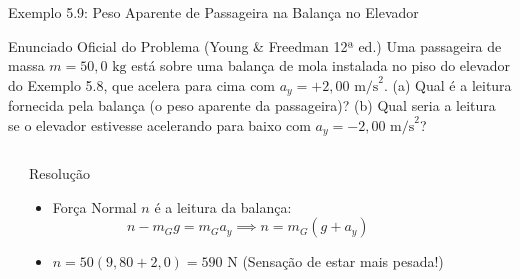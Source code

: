 \documentclass[10pt,aspectratio=169]{beamer}
\begin{document}
\begin{frame}{Exemplo 5.9: Peso Aparente de Passageira na Balança no Elevador}
    \begin{block}{Enunciado Oficial do Problema (Young \& Freedman 12ª ed.)}
        \small
        Uma passageira de massa $m = 50{,}0\text{ kg}$ está sobre uma balança de mola instalada no piso do elevador do Exemplo 5.8, que acelera para cima com $a_y = +2{,}00\text{ m/s}^2$. (a) Qual é a leitura fornecida pela balança (o peso aparente da passageira)? (b) Qual seria a leitura se o elevador estivesse acelerando para baixo com $a_y = -2{,}00\text{ m/s}^2$?
    \end{block}
    \begin{columns}[T]
        \begin{center}
        \end{center}
        \begin{exampleblock}{Resolução}
            \small
            \begin{itemize}\setlength{\itemsep}{3pt}
                \item Força Normal $n$ é a leitura da balança:
                $$n - m_G g = m_G a_y \implies n = m_G(g + a_y)$$
                \item $n = 50(9{,}80 + 2{,}0) = 590\text{ N}$ (Sensação de estar mais pesada!)
            \end{itemize}
        \end{exampleblock}
    \end{columns}
\end{frame}
\end{document}
